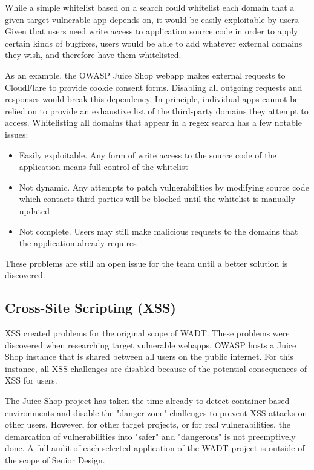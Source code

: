 \documentclass[12pt]{article}
\begin{document}
While a simple whitelist based on a search could whitelist each domain that a given target vulnerable app depends on, it would be easily exploitable by users. Given that users need write access to application source code in order to apply certain kinds of bugfixes, users would be able to add whatever external domains they wish, and therefore have them whitelisted.

As an example, the OWASP Juice Shop webapp makes external requests to CloudFlare to provide cookie consent forms. Disabling all outgoing requests and responses would break this dependency. In principle, individual apps cannot be relied on to provide an exhaustive list of the third-party domains they attempt to access. Whitelisting all domains that appear in a regex search has a few notable issues:

\begin{itemize}
	\item Easily exploitable. Any form of write access to the source code of the application means full control of the whitelist
	\item Not dynamic. Any attempts to patch vulnerabilities by modifying source code which contacts third parties will be blocked until the whitelist is manually updated
	\item Not complete. Users may still make malicious requests to the domains that the application already requires
\end{itemize}

These problems are still an open issue for the team until a better solution is discovered.

\subsection{Cross-Site Scripting (XSS)}
XSS created problems for the original scope of WADT. These problems were discovered when researching target vulnerable webapps. OWASP hosts a Juice Shop instance that is shared between all users on the public internet. For this instance, all XSS challenges are disabled because of the potential consequences of XSS for users.

The Juice Shop project has taken the time already to detect container-based environments and disable the "danger zone" challenges to prevent XSS attacks on other users. However, for other target projects, or for real vulnerabilities, the demarcation of vulnerabilities into "safer" and "dangerous" is not preemptively done. A full audit of each selected application of the WADT project is outside of the scope of Senior Design.
\end{document}

